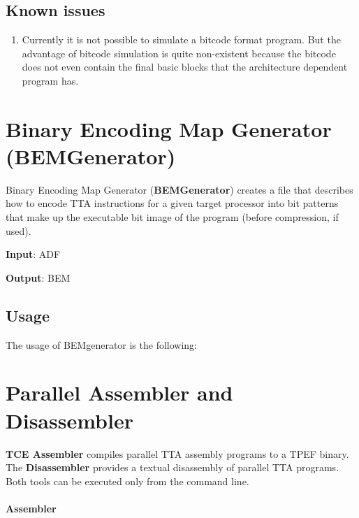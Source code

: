 \documentclass[twoside]{tceusermanual}
\begin{document}
\subsection{Known issues}
\label{sec:tceccIssues}
\begin{enumerate}

\item
Currently it is not possible to simulate a bitcode format program. But the
advantage of bitcode simulation is quite non-existent because the bitcode
does not even contain the final basic blocks that the architecture dependent
program has.
\end{enumerate}



\section{Binary Encoding Map Generator (BEMGenerator)}
\label{section:bemgen}
Binary Encoding Map Generator (\textbf{BEMGenerator}) creates a file that
describes how to encode TTA instructions for a given target processor into
bit patterns that make up the executable bit image of the program (before
compression, if used).

\textbf{Input}: ADF

\textbf{Output}: BEM

\subsection{Usage}

The usage of BEMgenerator is the following:


\section{Parallel Assembler and Disassembler}
\label{section:TCEAsm}

\textbf{TCE Assembler} compiles parallel TTA assembly programs to a TPEF
binary. The \textbf{Disassembler} provides a textual disassembly of
parallel TTA programs. Both tools can be executed only from the command
line.

\paragraph{Assembler}
\end{document}
